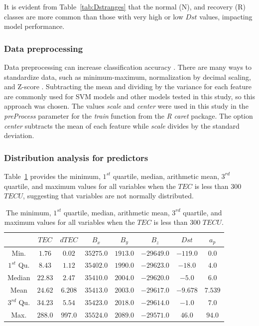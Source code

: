 \let\LaTeXcline\cline\documentclass[sn-mathphys-num]{sn-jnl}\let\cline\LaTeXcline
\begin{document}
It is evident from Table~\ref{tab:Dstranges} that the normal (N), and recovery (R) classes are more common than those with very high or low $Dst$ values, impacting model performance.

\subsubsection{Data preprocessing}

Data preprocessing can increase classification accuracy \cite{Fan2008}. There are many ways to standardize data, such as minimum-maximum, normalization by decimal scaling, and Z-score \cite{Mohamad2013}. Subtracting the mean and dividing by the variance for each feature are commonly used for SVM models \cite{Fennell2019} and other models tested in this study, so this approach was chosen. The values \textit{scale} and \textit{center} were used in this study in the \textit{preProcess} parameter for the \textit{train} function from the \textit{R} \textit{caret} package. The option \textit{center} subtracts the mean of each feature while \textit{scale} divides by the standard deviation.

\subsubsection{Distribution analysis for predictors}

Table~\ref{tab:minmax} provides the minimum, $1^{st}$ quartile, median, arithmetic mean, $3^{rd}$ quartile, and maximum values for all variables when the $TEC$ is less than $300$ $TECU$, suggesting that variables are not normally distributed.

\begin{table}[!ht]
    \centering
    \caption{The minimum, $1^{st}$ quartile, median, arithmetic mean, $3^{rd}$ quartile, and maximum values for all variables when the $TEC$ is less than $300$ $TECU$.}
    \label{tab:minmax}
        \begin{tabular}{|c|c|c|c|c|c|c|c|}
                \hline
                  & $TEC$ & $dTEC$ & $B_{x}$ & $B_{y}$ & $B_{z}$ & $Dst$ & $a_{p}$ \\ \hline
                Min. & $1.76$ & $0.02$ & $35275.0$ & $1913.0$ & $-29649.0$ & $-119.0$ & $0.0$ \\ \hline
                $1^{st}$ Qu. & $8.43$ & $1.12$ & $35402.0$ & $1990.0$ & $-29623.0$ & $-18.0$ & $4.0$ \\ \hline
                Median & $22.83$ & $2.47$ & $35410.0$ & $2004.0$ & $-29620.0$ & $-5.0$ & $6.0$ \\ \hline
                Mean & $24.62$ & $6.208$ & $35413.0$ & $2003.0$ & $-29617.0$ & $-9.678$ & $7.539$ \\ \hline
                $3^{rd}$ Qu. & $34.23$ & $5.54$ & $35423.0$ & $2018.0$ & $-29614.0$ & $-1.0$ & $7.0$ \\ \hline
                Max. & $288.0$ & $997.0$ & $35524.0$ & $2089.0$ & $-29571.0$ & $46.0$ & $94.0$ \\ \hline
        \end{tabular}
\end{table}
\end{document}
